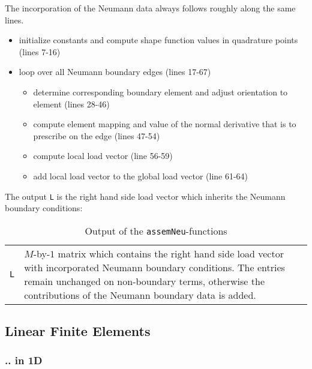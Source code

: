 The incorporation of the Neumann data always follows roughly along the same lines.

\begin{itemize}
 \item initialize constants and compute shape function values in quadrature points (lines 7-16)
 \item loop over all Neumann boundary edges (lines 17-67)
 \begin{itemize}
  \item determine corresponding boundary element and adjust orientation to element (lines 28-46)
  \item compute element mapping and value of the normal derivative that is to prescribe on the edge (lines 47-54)
  \item compute local load vector (line 56-59)
  \item add local load vector to the global load vector (line 61-64)
 \end{itemize}
\end{itemize}



 The output {\tt L} is the right hand side load vector which inherits the Neumann boundary conditions:

\begin{table}[htb]
  \begin{tabular}{p{0.5cm}p{10.5cm}}
	{\tt L} & {\small $M$-by-$1$ matrix which contains the right hand side load vector with incorporated Neumann boundary conditions. The entries remain unchanged on non-boundary terms, otherwise the contributions of the Neumann boundary data is added.} \\
  \end{tabular}
  \caption{Output of the {\tt assemNeu}-functions}
  \label{tab:neu_out}
\end{table}




\subsection{Linear Finite Elements} 

\subsubsection{.. in 1D}

